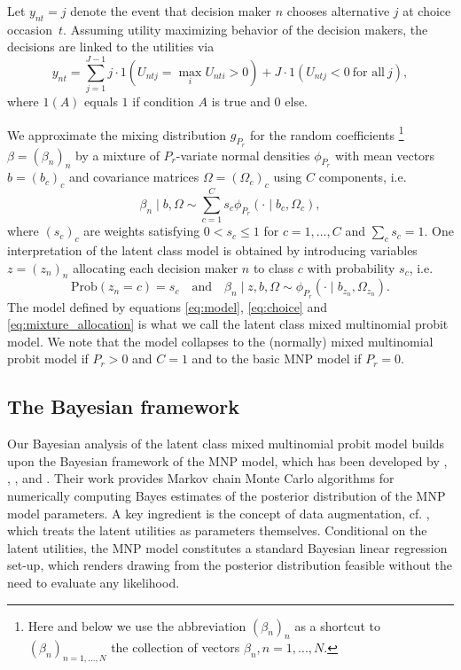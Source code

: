\documentclass[article]{jss}
\begin{document}
Let $y_{nt}=j$ denote the event that decision maker $n$ chooses alternative $j$ at choice occasion~$t$. Assuming utility maximizing behavior of the decision makers, the decisions are linked to the utilities via
\begin{equation}
\label{eq:choice}
y_{nt} = \sum_{j=1}^{J-1} j\cdot 1 \left (U_{ntj}=\max_i U_{nti}>0 \right) + J \cdot 1\left (U_{ntj}<0 ~\text{for all}~j\right),
\end{equation}
where $1(A)$ equals $1$ if condition $A$ is true and $0$ else.

We approximate the mixing distribution $g_{P_r}$ for the random coefficients \footnote{Here and below we use the abbreviation $(\beta_n)_n$ as a shortcut to $(\beta_n)_{n =1,...,N}$ the collection of vectors $\beta_n,n=1,...,N$.} $\beta=(\beta_n)_{n}$ by a mixture of $P_r$-variate normal densities $\phi_{P_r}$ with mean vectors $b=(b_c)_{c}$ and covariance matrices $\Omega=(\Omega_c)_{c}$ using $C$ components, i.e.
\begin{equation}
\label{eq:mixture}
\beta_n\mid b,\Omega \sim \sum_{c=1}^{C} s_c \phi_{P_r} (\cdot \mid b_c,\Omega_c),
\end{equation}
where $(s_c)_{c}$ are weights satisfying $0 < s_c\leq 1$ for $c=1,\dots,C$ and $\sum_c s_c=1$.
One interpretation of the latent class model is obtained by introducing variables $z=(z_n)_n$ allocating each decision maker $n$ to class $c$ with probability $s_c$, i.e.
\begin{equation}
\label{eq:mixture_allocation}
\text{Prob}(z_n=c)=s_c \quad \text{and} \quad \beta_n \mid z,b,\Omega \sim \phi_{P_r}(\cdot \mid b_{z_n},\Omega_{z_n}).
\end{equation}
The model defined by equations \eqref{eq:model}, \eqref{eq:choice} and \eqref{eq:mixture_allocation} is what we call the latent class mixed multinomial probit model. We note that the model collapses to the (normally) mixed multinomial probit model if $P_r>0$ and $C=1$ and to the basic MNP model if $P_r=0$.

\subsection{The Bayesian framework} \label{subsec:bayes}

Our Bayesian analysis of the latent class mixed multinomial probit model builds upon the Bayesian framework of the MNP model, which has been developed by \cite{McCulloch:94}, \cite{Nobile:98}, \cite{Allenby:98}, and \cite{Imai:05}. Their work provides Markov chain Monte Carlo algorithms for numerically computing Bayes estimates of the posterior distribution of the MNP model parameters. A key ingredient is the concept of data augmentation, cf. \cite{Albert:93}, which treats the latent utilities as parameters themselves. Conditional on the latent utilities, the MNP model constitutes a standard Bayesian linear regression set-up, which renders drawing from the posterior distribution feasible without the need to evaluate any likelihood.
\end{document}
